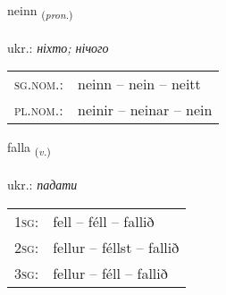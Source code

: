 \documentclass[frontgrid, backgrid]{flacards}\usepackage[]{graphicx}\usepackage[]{xcolor}
\begin{document}
\renewcommand{\flhead}{\vskip5pt \fboxsep=0pt {\small\bfseries\footnotesize Fornafn | займенник}}
\renewcommand{\fcfoot}{\vskip5pt \fboxsep=0pt \hspace{2pt}{\small\bfseries\footnotesize 1K}}

\renewcommand{\blhead}{\vskip5pt {\small\bfseries\footnotesize Fornafn | займенник }}
\renewcommand{\bcfoot}{\vskip5pt \hspace{2pt}{\small\bfseries\footnotesize 1K}}


{neinn \small{\textsubscript{(\textit{pron.})}} \\[1ex] %
\textphonetic{[neitn̥]} \\
ukr.: \emph{ніхто; нічого} \\  [2ex]
\renewcommand*{\arraystretch}{0.8}
\begin{tabular}{ll}
\textsc{sg.nom.}: & neinn  --  nein -- neitt \\ 
\textsc{pl.nom.}: & neinir -- neinar -- nein
\end{tabular}
}

\renewcommand{\flhead}{\vskip5pt \fboxsep=0pt {\small\bfseries\footnotesize Sagnorð | дієслово}}
\renewcommand{\fcfoot}{\vskip5pt \fboxsep=0pt \hspace{2pt}{\small\bfseries\footnotesize 1K}}

\renewcommand{\blhead}{\vskip5pt {\small\bfseries\footnotesize Sagnorð | дієслово }}
\renewcommand{\bcfoot}{\vskip5pt \hspace{2pt}{\small\bfseries\footnotesize 1K}}


{falla \small{\textsubscript{(\textit{v.})}} \\[1ex] %
\textphonetic{[fatla]} \\
ukr.: \emph{падати} \\  [2ex]
\renewcommand*{\arraystretch}{0.8}
\begin{tabular}{p{1cm}l}
\textsc{1sg}: & fell -- féll -- fallið \\ 
\textsc{2sg}: & fellur -- féllst -- fallið \\ 
\textsc{3sg}: & fellur -- féll -- fallið \\ 
\end{tabular}
}
\end{document}
